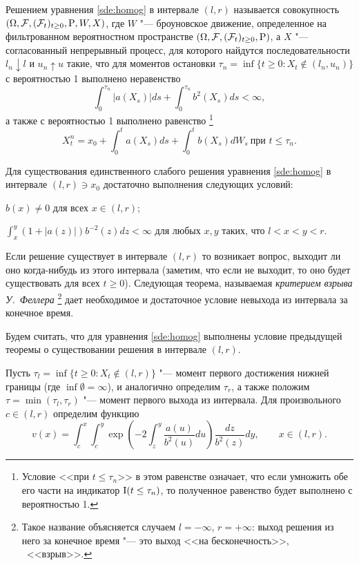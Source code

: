 \begin{definition}
Решением уравнения \eqref{sde:homog} в интервале $(l,r)$ называется совокупность $(\Omega,\mathcal{F},(\mathcal{F}_t)_{t\ge0},\mathrm{P},W,X)$, где $W$ "--- броуновское движение, определенное на фильтрованном вероятностном пространстве $(\Omega,\mathcal{F},(\mathcal{F}_t)_{t\ge0},\mathrm{P})$, а $X$ "--- согласованный непрерывный процесс, для которого найдутся последовательности $l_n\downarrow l$ и $u_n\uparrow u$ такие, что для моментов остановки $\tau_n = \inf\{t\ge0 : X_t \not\in(l_n,u_n)\}$ с вероятностью 1 выполнено неравенство
\[
\int_0^{\tau_n} |a(X_s)|ds + \int_0^{\tau_n} b^2(X_s)ds < \infty,
\]
а также с вероятностью 1 выполнено равенство%
\footnote{Условие <<при $t\le\tau_n$>> в этом равенстве означает, что если умножить обе его части на индикатор $\operatorname{I}(t\le\tau_n)$, то полученное равенство будет выполнено с вероятностью 1.}
\[
X_t^n = x_0 + \int_0^t a(X_s)ds + \int_0^t b(X_s)dW_s\ \text{при $t\le \tau_n$}.
\]
\end{definition}



\begin{theorem}
\label{sde:t:es-2}
Для существования единственного слабого решения уравнения \eqref{sde:homog} в интервале $(l,r)\ni x_0$ достаточно выполнения следующих условий:
\begin{alphenum}
\item $b(x)\neq 0$ для всех $x\in(l,r)$;
\item $\int_x^y (1+|a(z)|)b^{-2}(z) dz <\infty$ для любых $x,y$ таких, что $l<x<y<r$.
\end{alphenum}
\end{theorem}

Если решение существует в интервале $(l,r)$ то возникает вопрос, выходит ли оно когда-нибудь из этого интервала (заметим, что если не выходит, то оно будет существовать для всех $t\ge 0$).
Следующая теорема, называемая \emph{критерием взрыва У.~Феллера}%
\footnote{Такое название объясняется случаем $l=-\infty$, $r=+\infty$: выход решения из него за конечное время "--- это выход <<на бесконечность>>, \te\ <<взрыв>>.}
дает необходимое и достаточное условие невыхода из интервала за конечное время.

Будем считать, что для уравнения \eqref{sde:homog} выполнены условие предыдущей теоремы о существовании решения в интервале $(l,r)$.

Пусть $\tau_l = \inf\{t\ge 0: X_t \notin(l,r)\}$ "--- момент первого достижения нижней границы (где $\inf\emptyset = \infty$), и аналогично определим $\tau_r$, а также положим $\tau = \min(\tau_l,\tau_r)$ "--- момент первого выхода из интервала.
Для произвольного $c\in(l,r)$ определим функцию
\[
v(x) = \int_c^x \int_c^y \exp\left(-2\int_z^y \frac{a(u)}{b^2(u)} du \right)\frac{dz}{b^2(z)} dy, \qquad x \in(l,r).
\]

